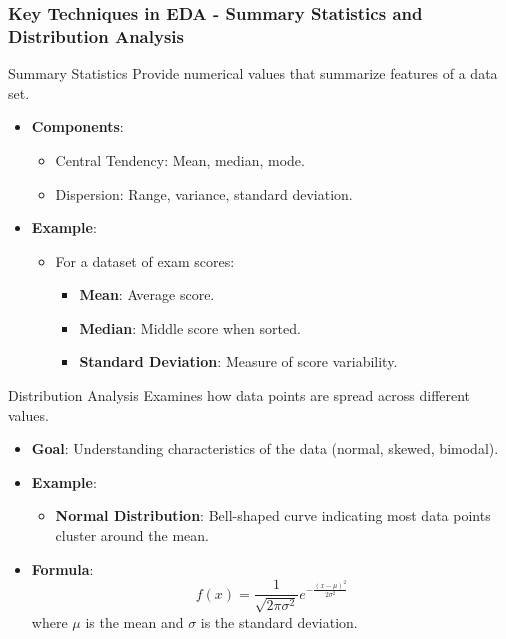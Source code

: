 \documentclass{beamer}
\begin{document}
\begin{frame}[fragile]
    \frametitle{Key Techniques in EDA - Summary Statistics and Distribution Analysis}
    
    \begin{block}{Summary Statistics}
        Provide numerical values that summarize features of a data set.
    \end{block}
    
    \begin{itemize}
        \item \textbf{Components}:
            \begin{itemize}
                \item Central Tendency: Mean, median, mode.
                \item Dispersion: Range, variance, standard deviation.
            \end{itemize}
        
        \item \textbf{Example}:
            \begin{itemize}
                \item For a dataset of exam scores:
                    \begin{itemize}
                        \item \textbf{Mean}: Average score.
                        \item \textbf{Median}: Middle score when sorted.
                        \item \textbf{Standard Deviation}: Measure of score variability.
                    \end{itemize}
            \end{itemize}
    \end{itemize}
    
    \begin{block}{Distribution Analysis}
        Examines how data points are spread across different values.
    \end{block}
    
    \begin{itemize}
        \item \textbf{Goal}: Understanding characteristics of the data (normal, skewed, bimodal).
        \item \textbf{Example}:
            \begin{itemize}
                \item \textbf{Normal Distribution}: Bell-shaped curve indicating most data points cluster around the mean.
            \end{itemize}
        \item \textbf{Formula}:
            \begin{equation}
                f(x) = \frac{1}{\sqrt{2\pi\sigma^2}} e^{-\frac{(x - \mu)^2}{2\sigma^2}}
            \end{equation}
            where $\mu$ is the mean and $\sigma$ is the standard deviation.
    \end{itemize}
    

\end{frame}
\end{document}
